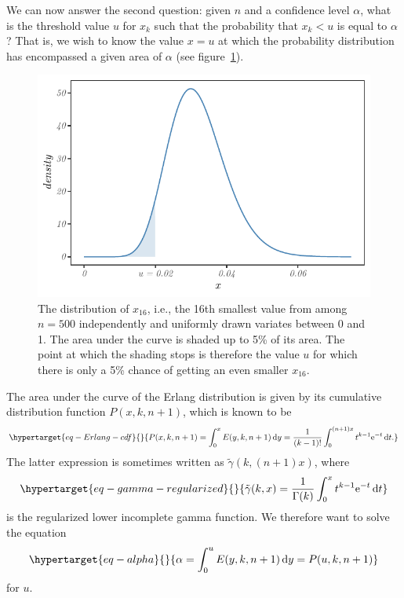 We can now answer the second question: given $n$ and a confidence
level $\alpha$, what is the threshold value $u$ for $x_k$ such
that the probability that $x_k < u$ is equal to $\alpha$? That is,
we wish to know the value $x = u$ at which the probability
distribution has encompassed a given area of $\alpha$ (see figure~\ref{fig-alpha}).

\begin{figure}[!ht]
  \centering \includegraphics[width=.7\textwidth]{fig/fig-alpha-1.pdf}
  \caption[The 16th smallest value among $500$ random variates on unit interval]{The distribution of $x_{16}$, i.e., the 16th smallest value from among $n=500$ independently and uniformly drawn variates between 0 and 1. The area under the curve is shaded up to 5\% of its area. The point at which the shading stops is therefore the value $u$ for which there is only a 5\% chance of getting an even smaller $x_{16}$.}
  \label{fig-alpha}
\end{figure}

The area under
the curve of the Erlang distribution is given by its cumulative
distribution function $P(x,k,n+1)$, which is known to be
\begin{equation}\protect\hypertarget{eq-Erlang-cdf}{}{
P(x,k,n+1)
= \int_0^x E(y,k,n+1) \,\text{d}y
= \frac{1}{(k-1)!} \int_0^{(n+1)x} t^{k-1}\text{e}^{-t} \,\text{d} t .
}\label{eq-Erlang-cdf}\end{equation} The latter expression is sometimes
written as $\tilde{\gamma}(k,(n+1)x)$, where
\begin{equation}\protect\hypertarget{eq-gamma-regularized}{}{
\tilde{\gamma}(k,x)
= \frac{1}{\Gamma(k)} \int_0^x t^{k-1} \text{e}^{-t} \,\text{d}t
}\label{eq-gamma-regularized}\end{equation} is the regularized lower
incomplete gamma function. We therefore want to solve the equation
\begin{equation}\protect\hypertarget{eq-alpha}{}{
\alpha
= \int_0^u E(y,k,n+1) \,\text{d}y = P(u,k,n+1)
}\label{eq-alpha}\end{equation} for $u$.

